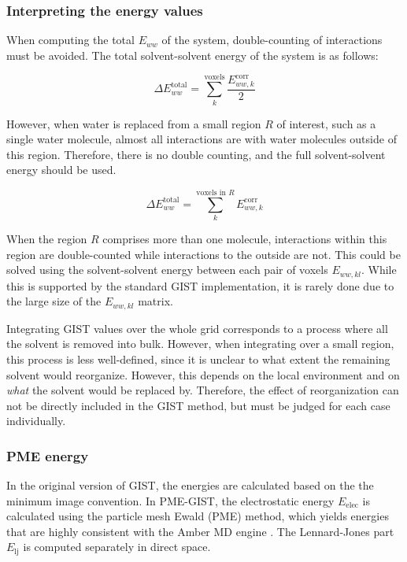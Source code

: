 \documentclass[9pt,tutorial]{livecoms}
\begin{document}
\subsubsection{Interpreting the energy values}
When computing the total $E_{ww}$ of the system, double-counting of interactions must be avoided.
The total solvent-solvent energy of the system is as follows:

\begin{equation}
	\Delta E^\text{total}_{ww} = \sum_{k}^\text{voxels} \frac{E_{ww,k}^\text{corr}}{2}
\end{equation}

However, when water is replaced from a small region $R$ of interest, such as a single water molecule, almost all interactions are with water molecules outside of this region.
Therefore, there is no double counting, and the full solvent-solvent energy should be used.

\begin{equation}
	\Delta E^\text{total}_{ww} = \sum_{k}^{\text{voxels in }R} E_{ww,k}^\text{corr}
\end{equation}

When the region $R$ comprises more than one molecule, interactions within this region are double-counted while interactions to the outside are not.
This could be solved using the solvent-solvent energy between each pair of voxels $E_{ww,kl}$.
While this is supported by the standard GIST implementation, it is rarely done due to the large size of the $E_{ww,kl}$ matrix.

Integrating GIST values over the whole grid corresponds to a process where all the solvent is removed into bulk.
However, when integrating over a small region, this process is less well-defined, since it is unclear to what extent the remaining solvent would reorganize.
However, this depends on the local environment and on \emph{what} the solvent would be replaced by.
Therefore, the effect of reorganization can not be directly included in the GIST method, but must be judged for each case individually.

\subsubsection{PME energy}

In the original version of GIST, the energies are calculated based on the the minimum image convention.
In PME-GIST, the electrostatic energy $E_\text{elec}$ is calculated using the particle mesh Ewald (PME) method, which yields energies that are highly consistent with the Amber MD engine \cite{Chen2021}.
The Lennard-Jones part $E_\text{lj}$ is computed separately in direct space.
\end{document}
